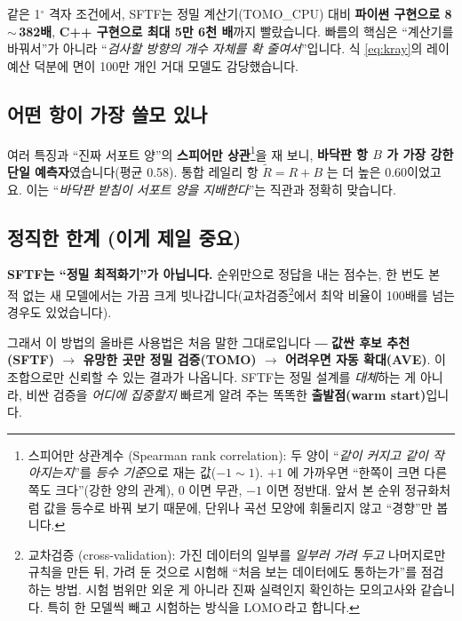 \documentclass[11pt,a4paper]{article}
\begin{document}
같은 1$^\circ$ 격자 조건에서, SFTF는 정밀 계산기(TOMO\_CPU) 대비
\textbf{파이썬 구현으로 8\,$\sim$\,382배}, \textbf{C++ 구현으로 최대 5만 6천 배}까지
빨랐습니다. 빠름의 핵심은 ``계산기를 바꿔서''가 아니라 ``\emph{검사할 방향의 개수
자체를 확 줄여서}''입니다. 식 \eqref{eq:kray}의 레이 예산 덕분에 면이 100만 개인
거대 모델도 감당했습니다.

\subsection{어떤 항이 가장 쓸모 있나}

여러 특징과 ``진짜 서포트 양''의 \textbf{스피어만 상관}\footnote{스피어만 상관계수
(Spearman rank correlation): 두 양이 ``\emph{같이 커지고 같이 작아지는지}''를
\emph{등수 기준}으로 재는 값($-1\sim1$). $+1$ 에 가까우면 ``한쪽이 크면 다른 쪽도
크다''(강한 양의 관계), $0$ 이면 무관, $-1$ 이면 정반대. 앞서 본 순위 정규화처럼
값을 등수로 바꿔 보기 때문에, 단위나 곡선 모양에 휘둘리지 않고 ``경향''만 봅니다.}을
재 보니, \textbf{바닥판 항 $B$ 가 가장 강한 단일 예측자}였습니다(평균 0.58). 통합
레일리 항 $\tilde R=R+B$ 는 더 높은 0.60이었고요. 이는 ``\emph{바닥판 받침이 서포트
양을 지배한다}''는 직관과 정확히 맞습니다.

\subsection{정직한 한계 (이게 제일 중요)}

\begin{notebox}
\textbf{SFTF는 ``정밀 최적화기''가 아닙니다.} 순위만으로 정답을 내는 점수는, 한 번도
본 적 없는 새 모델에서는 가끔 크게 빗나갑니다(교차검증\footnote{교차검증
(cross-validation): 가진 데이터의 일부를 \emph{일부러 가려 두고} 나머지로만 규칙을
만든 뒤, 가려 둔 것으로 시험해 ``처음 보는 데이터에도 통하는가''를 점검하는 방법.
시험 범위만 외운 게 아니라 진짜 실력인지 확인하는 모의고사와 같습니다. 특히 한 모델씩
빼고 시험하는 방식을 LOMO\,\footnotemark 라고 합니다.}에서 최악 비율이 100배를 넘는 경우도 있었습니다).
\end{notebox}

그래서 이 방법의 올바른 사용법은 처음 말한 그대로입니다 ― \textbf{값싼 후보 추천
(SFTF) $\to$ 유망한 곳만 정밀 검증(TOMO) $\to$ 어려우면 자동 확대(AVE)}. 이 조합으로만
신뢰할 수 있는 결과가 나옵니다. SFTF는 정밀 설계를 \emph{대체}하는 게 아니라, 비싼
검증을 \emph{어디에 집중할지} 빠르게 알려 주는 똑똑한 \textbf{출발점(warm start)}입니다.
\end{document}
